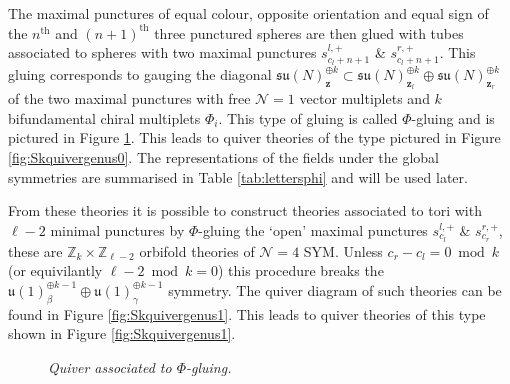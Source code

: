 \documentclass[main.tex]{subfiles}
\begin{document}
The maximal punctures of equal colour, opposite orientation and equal sign of the $n^{\text{th}}$ and $(n+1)^{\text{th}}$ three punctured spheres are then glued with tubes associated to spheres with two maximal punctures $s_{c_l+n+1}^{l,+}$ \& $s_{c_l+n+1}^{r,+}$.  This gluing corresponds to gauging the diagonal $\mathfrak{su}(N)_{\mathbf{z}}^{\oplus k}\subset\mathfrak{su}(N)_{\mathbf{z}_l}^{\oplus k}\oplus \mathfrak{su}(N)_{\mathbf{z}_r}^{\oplus k}$ of the two maximal punctures with free $\mathcal{N}=1$ vector multiplets and $k$ bifundamental chiral multiplets $\Phi_i$.
This type of gluing is called $\Phi$-gluing and is pictured in Figure \ref{fig:tube}.  This leads to quiver theories of the type pictured in Figure \ref{fig:Skquivergenus0}.  The representations of the fields under the global symmetries are summarised in Table \ref{tab:lettersphi} and will be used later.  

From these theories it is possible to construct theories associated to tori with $\ell-2$ minimal punctures by $\Phi$-gluing the `open' maximal punctures $s_{c_l}^{l,+}$ \& $s_{c_r}^{r,+}$, these are $\mathbb{Z}_k\times\mathbb{Z}_{\ell-2}$ orbifold theories of $\mathcal{N}=4$ SYM.  Unless $c_r-c_l=0\bmod k$ (or equivilantly $\ell-2\bmod k=0$) this procedure breaks the $\mathfrak{u}(1)^{\oplus k-1}_{\beta}\oplus\mathfrak{u}(1)^{\oplus k-1}_{\gamma}$ symmetry.  The quiver diagram of such theories can be found in Figure \ref{fig:Skquivergenus1}.  This leads to quiver theories of this type shown in Figure \ref{fig:Skquivergenus1}.
\begin{figure}
\centering
\begin{subfigure}{.5\textwidth}
\centering
{}
 \end{subfigure}%
 \begin{subfigure}{.5\textwidth}
 \centering
 \end{subfigure}%
  \caption{\it Quiver associated to $\Phi$-gluing.}
  \label{fig:tube}
\end{figure}
\end{document}
